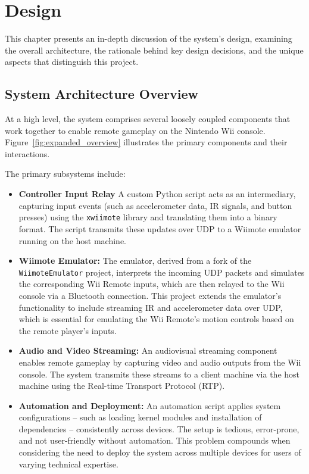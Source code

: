\chapter{Design}
\label{chapter:design}

This chapter presents an in-depth discussion of the system's design, examining
the overall architecture, the rationale behind key design decisions, and the
unique aspects that distinguish this project.

\section{System Architecture Overview}

At a high level, the system comprises several loosely coupled components that
work together to enable remote gameplay on the Nintendo Wii console.
Figure~\ref{fig:expanded_overview} illustrates the primary components
and their interactions.

The primary subsystems include:
\begin{itemize}
	\item \textbf{Controller Input Relay}
	      A custom Python script acts as an intermediary, capturing input events
	      (such as accelerometer data, IR signals, and button presses) using the
	      \texttt{xwiimote} library\cite{xwiimote} and translating them into a binary
	      format. The script transmits these updates over UDP\cite{wikipediaUDP} to a Wiimote emulator running on the host machine.

	\item \textbf{Wiimote Emulator:}
	      The emulator, derived from a fork\cite{jr_wiimote_emu} of the
	      \linebreak \texttt{WiimoteEmulator} project\cite{wiimote_emulator}, interprets the incoming
	      UDP packets and simulates the corresponding Wii Remote inputs, which are then
	      relayed to the Wii console via a Bluetooth connection. This project extends the
	      emulator's functionality to include streaming IR and accelerometer data over
	      UDP, which is essential for emulating the Wii Remote's motion controls based on
	      the remote player's inputs.

	\item \textbf{Audio and Video Streaming:}
	      An audiovisual streaming component enables remote gameplay by capturing
	      video and audio outputs from the Wii console. The system transmits these streams
	      to a client machine via the host machine using the Real-time Transport Protocol
	      (RTP)\cite{wikipediaRTP}.

	\item \textbf{Automation and Deployment:}
	      An automation script applies system configurations  -- such as loading
	      kernel modules and installation of dependencies  -- consistently across
	      devices.  The setup is tedious, error-prone, and not user-friendly without
	      automation. This problem compounds when considering the need to deploy the
	      system across multiple devices for users of varying technical expertise.
\end{itemize}

